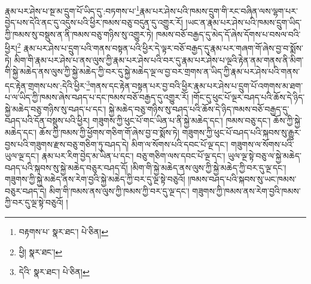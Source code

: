 རྣམ་པར་ཤེས་པ་སྔ་མ་དྲུག་པོ་ཡིད་དུ་:བཏགས་པ་\footnote{བརྟགས་པ་  སྣར་ཐང་།  པེ་ཅིན། }རྣམ་པར་ཤེས་པའི་ཁམས་དྲུག་གི་རང་བཞིན་ལས་ལྷག་པར་བྱེད་པས་དེའི་ནང་དུ་འདུས་པའི་ཕྱིར་ཁམས་བཅུ་བདུན་དུ་འགྱུར་རོ། །ཡང་ན་རྣམ་པར་ཤེས་པའི་ཁམས་དྲུག་ཡིད་ཀྱི་ཁམས་སུ་བསྡུས་ན་ནི་ཁམས་བཅུ་གཉིས་སུ་འགྱུར་ཏེ། ཁམས་བཅོ་བརྒྱད་དུ་མེད་དོ་ཞེས་དོགས་པ་བསལ་བའི་ཕྱིར།\footnote{ཕྱི།  སྣར་ཐང་། } རྣམ་པར་ཤེས་པ་དྲུག་པའི་གནས་བསྟན་པའི་ཕྱིར་དེ་ལྟར་བཅོ་བརྒྱད་དུ་རྣམ་པར་གཞག་གོ་ཞེས་བྱ་བ་སྨོས་ཏེ། མིག་གི་རྣམ་པར་ཤེས་པ་ནས་ལུས་ཀྱི་རྣམ་པར་ཤེས་པའི་བར་དུ་རྣམ་པར་ཤེས་པ་ལྔའི་རྟེན་ནམ་གནས་ནི་མིག་གི་སྐྱེ་མཆེད་ནས་ལུས་ཀྱི་སྐྱེ་མཆེད་ཀྱི་བར་དུ་སྐྱེ་མཆེད་ལྔ་ལ་བྱ་བར་གྲགས་ན་ཡིད་ཀྱི་རྣམ་པར་ཤེས་པའི་གནས་དང་རྟེན་གྲགས་པས་:དེའི་ཕྱིར་\footnote{དེའི་  སྣར་ཐང་།  པེ་ཅིན། }གནས་དང་རྟེན་བསྟན་པར་བྱ་བའི་ཕྱིར་རྣམ་པར་ཤེས་པ་དྲུག་པོ་འགགས་མ་ཐག་པ་ལ་ཡིད་ཀྱི་ཁམས་ཞེས་བཤད་པ་དང་ཁམས་བཅོ་བརྒྱད་དུ་འགྱུར་རོ། །གོང་དུ་ཕུང་པོ་ལྔར་བཤད་པའི་ཆོས་དེ་ཉིད་སྐྱེ་མཆེད་བཅུ་གཉིས་སུ་བཤད་པ་དང་། སྐྱེ་མཆེད་བཅུ་གཉིས་སུ་བཤད་པའི་ཆོས་དེ་ཉིད་ཁམས་བཅོ་བརྒྱད་དུ་བཤད་པའི་དོན་བསྡུས་པའི་ཕྱིར། གཟུགས་ཀྱི་ཕུང་པོ་གང་ཡིན་པ་ནི་སྐྱེ་མཆེད་དང་། ཁམས་བཅུ་དང་། ཆོས་ཀྱི་སྐྱེ་མཆེད་དང་། ཆོས་ཀྱི་ཁམས་ཀྱི་ཕྱོགས་གཅིག་གོ་ཞེས་བྱ་བ་སྨོས་ཏེ། གཟུགས་ཀྱི་ཕུང་པོ་བཤད་པའི་སྐབས་སུ་རྒྱུར་བྱས་པའི་གཟུགས་རྫས་བཅུ་གཅིག་ཏུ་བཤད་དེ། མིག་ལ་སོགས་པའི་དབང་པོ་ལྔ་དང་། གཟུགས་ལ་སོགས་པའི་ཡུལ་ལྔ་དང་། རྣམ་པར་རིག་བྱེད་མ་ཡིན་པ་དང་། བཅུ་གཅིག་ལས་དབང་པོ་ལྔ་དང་། ཡུལ་ལྔ་སྟེ་བཅུ་ལ་སྐྱེ་མཆེད་བཤད་པའི་སྐབས་སུ་སྐྱེ་མཆེད་བཅུར་བཤད་དོ། །མིག་གི་སྐྱེ་མཆེད་ནས་ལུས་ཀྱི་སྐྱེ་མཆེད་ཀྱི་བར་དུ་ལྔ་དང་། གཟུགས་ཀྱི་སྐྱེ་མཆེད་ནས་རེག་བྱའི་སྐྱེ་མཆེད་ཀྱི་བར་དུ་ལྔ་སྟེ་བཅུའོ། །ཁམས་བཤད་པའི་སྐབས་སུ་ཡང་ཁམས་བཅུར་བཤད་དེ། མིག་གི་ཁམས་ནས་ལུས་ཀྱི་ཁམས་ཀྱི་བར་དུ་ལྔ་དང་། གཟུགས་ཀྱི་ཁམས་ནས་རེག་བྱའི་ཁམས་ཀྱི་བར་དུ་ལྔ་སྟེ་བཅུའོ། །
